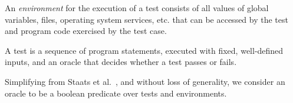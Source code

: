 \begin{definition}[Environment]
An \emph{environment} \env for the execution of a test
consists of all values of global variables, files,
operating
system services, etc. that
can be accessed by the test and program code exercised by the test
case.
%
\end{definition}

\begin{definition}[Test]
%

A test is a sequence of program statements, executed with fixed,
well-defined inputs, and an oracle that
decides whether a test passes or fails.
\end{definition}



Simplifying from Staats
et al.~\cite{staatsetal:ICSE:2011}, and without loss of generality,
we consider an oracle to be a boolean predicate over tests and environments.

